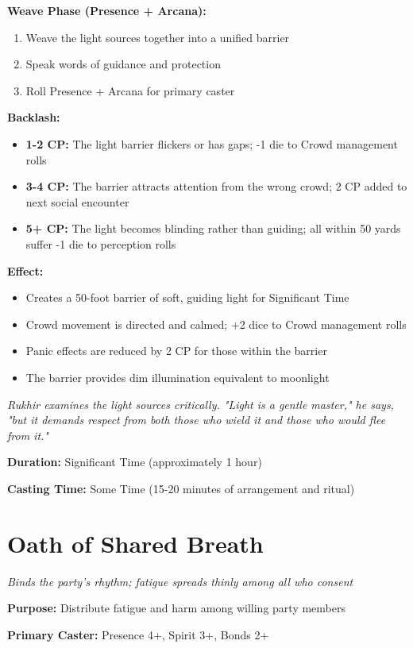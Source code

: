 \documentclass[12pt,twoside]{book}
\newcommand{\shadow}[1]{\textit{#1}}
\begin{document}
\textbf{Weave Phase (Presence + Arcana):}
\begin{enumerate}
\item Weave the light sources together into a unified barrier
\item Speak words of guidance and protection
\item Roll Presence + Arcana for primary caster
\end{enumerate}

\textbf{Backlash:}
\begin{itemize}
\item \textbf{1-2 CP:} The light barrier flickers or has gaps; -1 die to Crowd management rolls
\item \textbf{3-4 CP:} The barrier attracts attention from the wrong crowd; 2 CP added to next social encounter
\item \textbf{5+ CP:} The light becomes blinding rather than guiding; all within 50 yards suffer -1 die to perception rolls
\end{itemize}

\textbf{Effect:}
\begin{itemize}
\item Creates a 50-foot barrier of soft, guiding light for Significant Time
\item Crowd movement is directed and calmed; +2 dice to Crowd management rolls
\item Panic effects are reduced by 2 CP for those within the barrier
\item The barrier provides dim illumination equivalent to moonlight
\end{itemize}

\shadow{Rukhir examines the light sources critically. "Light is a gentle master," he says, "but it demands respect from both those who wield it and those who would flee from it."}

\textbf{Duration:} Significant Time (approximately 1 hour)

\textbf{Casting Time:} Some Time (15-20 minutes of arrangement and ritual)

\section*{Oath of Shared Breath}
\textit{Binds the party's rhythm; fatigue spreads thinly among all who consent}

\textbf{Purpose:} Distribute fatigue and harm among willing party members

\textbf{Primary Caster:} Presence 4+, Spirit 3+, Bonds 2+
\end{document}

